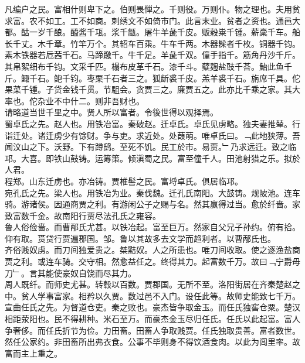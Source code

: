 \documentclass{zhvt-classic}
\begin{document}
\hspace*{2em}凡编户之民。富相什则卑下之。伯则畏惮之。千则役。万则仆。物之理也。夫用贫求富。农不如工。工不如商。刺绣文不如倚市门。此言末业。贫者之资也。通邑大都。酤一岁千酿。醯酱千瓨。浆千甔。屠牛羊彘千皮。贩穀粜千锺。薪稾千车。船长千丈。木千章。竹竿万个。其轺车百乘。牛车千两。木器髹者千枚。铜器千钧。素木铁器若卮茜千石。马蹄躈千。牛千足。羊彘千双。僮手指千。筋角丹沙千斤。其帛絮细布千钧。文采千匹。榻布皮革千石。漆千斗。糵麹盐豉千荅。鮐{此鱼}千斤。鲰千石。鲍千钧。枣栗千石者三之。狐龂裘千皮。羔羊裘千石。旃席千具。佗果菜千锺。子贷金钱千贯。节駔会。贪贾三之。廉贾五之。此亦比千乘之家。其大率也。佗杂业不中什二。则非吾财也。\\
\hspace*{2em}请略道当世千里之中。贤人所以富者。令後世得以观择焉。\\
\hspace*{2em}蜀卓氏之先。赵人也。用铁冶富。秦破赵。迁卓氏。卓氏见虏略。独夫妻推辇。行诣迁处。诸迁虏少有馀财。争与吏。求近处。处葭萌。唯卓氏曰。﹁此地狭薄。吾闻汶山之下。沃野。下有蹲鸱。至死不饥。民工於市。易贾。﹂乃求远迁。致之临邛。大喜。即铁山鼓铸。运筹策。倾滇蜀之民。富至僮千人。田池射猎之乐。拟於人君。\\
\hspace*{2em}程郑。山东迁虏也。亦冶铸。贾椎髻之民。富埒卓氏。俱居临邛。\\
\hspace*{2em}宛孔氏之先。梁人也。用铁冶为业。秦伐魏。迁孔氏南阳。大鼓铸。规陂池。连车骑。游诸侯。因通商贾之利。有游闲公子之赐与名。然其赢得过当。愈於纤啬。家致富数千金。故南阳行贾尽法孔氏之雍容。\\
\hspace*{2em}鲁人俗俭啬。而曹邴氏尤甚。以铁冶起。富至巨万。然家自父兄子孙约。俯有拾。仰有取。贳贷行贾遍郡国。邹。鲁以其故多去文学而趋利者。以曹邴氏也。\\
\hspace*{2em}齐俗贱奴虏。而刀间独爱贵之。桀黠奴。人之所患也。唯刀间收取。使之逐渔盐商贾之利。或连车骑。交守相。然愈益任之。终得其力。起富数千万。故曰﹁宁爵毋刀﹂。言其能使豪奴自饶而尽其力。\\
\hspace*{2em}周人既纤。而师史尤甚。转毂以百数。贾郡国。无所不至。洛阳街居在齐秦楚赵之中。贫人学事富家。相矜以久贾。数过邑不入门。设任此等。故师史能致七千万。\\
\hspace*{2em}宣曲任氏之先。为督道仓吏。秦之败也。豪杰皆争取金玉。而任氏独窖仓粟。楚汉相距荥阳也。民不得耕种。米石至万。而豪杰金玉尽归任氏。任氏以此起富。富人争奢侈。而任氏折节为俭。力田畜。田畜人争取贱贾。任氏独取贵善。富者数世。然任公家约。非田畜所出弗衣食。公事不毕则身不得饮酒食肉。以此为闾里率。故富而主上重之。\\
\end{document}

